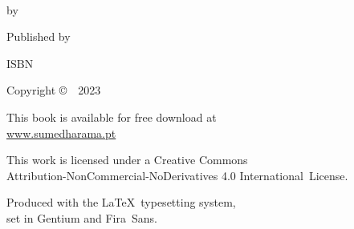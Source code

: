 \cleartoverso
\thispagestyle{empty}

{\copyrightsize
\centering
\setlength{\parindent}{0pt}%
\setlength{\parskip}{0.8\baselineskip}%

\thetitle\\
by \theauthor

Published by \thePublisher

ISBN \theISBN

Copyright \copyright\ \thePublisher\ 2023

This book is available for free download at\\
\href{https://sumedharama.pt}{www.sumedharama.pt}

\vfill

{\footnotesize

This work is licensed under a Creative Commons\\
Attribution-NonCommercial-NoDerivatives 4.0 International~License.

Produced with the \LaTeX\ typesetting system,\\ set in Gentium and Fira~Sans.

\theEditionInfo

}}
